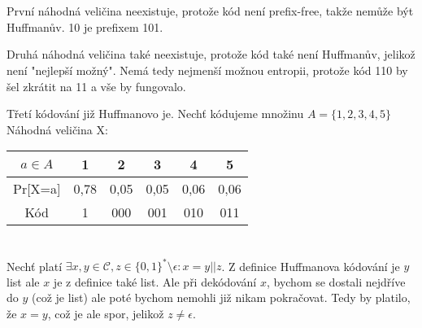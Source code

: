 \documentclass[12pt, a4paper]{article}
\begin{document}
\section{}
První náhodná veličina neexistuje, protože kód není prefix-free, takže nemůže být Huffmanův. 10 je prefixem 101.

Druhá náhodná veličina také neexistuje, protože kód také není Huffmanův, jelikož není "nejlepší možný". Nemá tedy nejmenší možnou entropii, protože kód 110 by šel zkrátit na 11 a vše by fungovalo.

Třetí kódování již Huffmanovo je. Nechť kódujeme množinu $A = \{1,2,3,4,5\}$  Náhodná veličina X: 
\begin{center}
\begin{tabular}{ |c|c|c|c|c|c| } 
\hline
$a \in A$ &1 & 2 & 3 & 4 & 5\\ 
\hline
Pr[X=a] & 0,78 & 0,05 & 0,05 & 0,06 & 0,06\\ 
\hline
Kód & 1 & 000 & 001 & 010 & 011\\ 
\hline
\end{tabular}
\end{center}

\section{}
Nechť platí $\exists x,y \in \mathcal{C}, z \in \{0,1\}^* \setminus \epsilon : x=y||z$. Z definice Huffmanova kódování je $y$ list ale $x$ je z definice také list. Ale při dekódování $x$, bychom se dostali nejdříve do $y$ (což je list) ale poté bychom nemohli již nikam pokračovat. Tedy by platilo, že $x=y$, což je ale spor, jelikož $z \neq \epsilon$.
\end{document}
